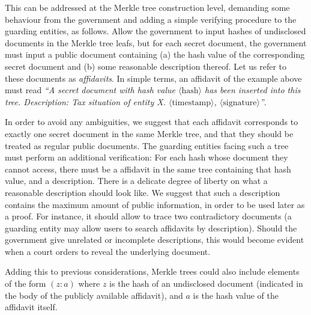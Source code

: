 This can be addressed at the Merkle tree construction level, demanding some behaviour from the government and adding a simple verifying procedure to the guarding entities, as follows. Allow the government to input hashes of undisclosed documents in the Merkle tree leafs, but for each secret document, the government must input a public document containing (a) the hash value of the corresponding secret document and (b) some reasonable description thereof. Let us refer to these documents as \textit{affidavits}. In simple terms, an affidavit of the example above must read \textit{``A secret document with hash value $\langle \mbox{hash}\rangle$ has been inserted into this tree. Description: Tax situation of entity X. $\langle\mbox{timestamp}\rangle$, $\langle\mbox{signature}\rangle$''}. 

In order to avoid any ambiguities, we suggest that each affidavit corresponds to exactly one secret document in the same Merkle tree, and that they should be treated as regular public documents. The guarding entities facing such a tree must perform an additional verification: For each hash whose document they cannot access, there must be a affidavit in the same tree containing that hash value, and a description. There is a delicate degree of liberty on what a reasonable description should look like. We suggest that such a description contains the maximum amount of public information, in order to be used later as a proof. For instance, it should allow to trace two contradictory documents (a guarding entity may allow users to search affidavits by description). Should the government give unrelated or incomplete descriptions, this would become evident when a court orders to reveal the underlying document. 

Adding this to previous considerations, Merkle trees could also include elements of the form $(z:a)$ where $z$ is the hash of an undisclosed document (indicated in the body of the publicly available affidavit), and $a$ is the hash value of the affidavit itself.
%
%

